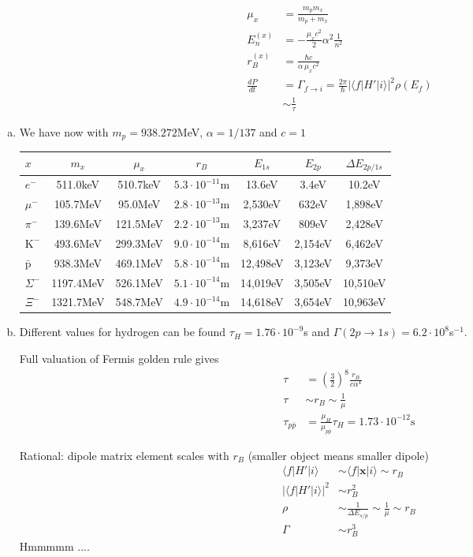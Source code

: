 \documentclass[../main.tex]{subfiles}
\begin{document}
\begin{align}
\mu_x&=\frac{m_pm_x}{m_p+m_x}\\
E_n^{(x)}&=-\frac{\mu_x c^2}{2}\alpha^2\frac{1}{n^2}\\
r_B^{(x)}&=\frac{\hbar c}{\alpha\, \mu_x c^2}\\
\frac{dP}{dt}&=\Gamma_{f\rightarrow i}=\frac{2\pi}{\hbar}|\langle f|H'|i\rangle|^2\rho(E_f)\\
&\sim\frac{1}{\tau}
\end{align}
\begin{enumerate}[(a)]
\item We have now with $m_p=938.272$MeV, $\alpha=1/137$ and $c=1$ 
\begin{center}
\begin{tabular}{lcccccc}
$x$              & $m_x$       & $\mu_x$ & $r_B$ & $E_{1s}$ & $E_{2p}$ & $\Delta E_{2p/1s}$ \\ \hline
$e^-$            & 511.0keV  & 510.7keV & $5.3\cdot10^{-11}$m &   13.6eV &   3.4eV &  10.2eV\\
$\mu^-$          & 105.7MeV  &  95.0MeV & $2.8\cdot10^{-13}$m &  2,530eV &   632eV & 1,898eV\\
$\pi^-$          & 139.6MeV  & 121.5MeV & $2.2\cdot10^{-13}$m &  3,237eV &   809eV & 2,428eV\\
$\text{K}^-$     & 493.6MeV  & 299.3MeV & $9.0\cdot10^{-14}$m &  8,616eV & 2,154eV & 6,462eV\\
$\bar{\text{p}}$ & 938.3MeV  & 469.1MeV & $5.8\cdot10^{-14}$m & 12,498eV & 3,123eV & 9,373eV\\
$\Sigma^-$       & 1197.4MeV & 526.1MeV & $5.1\cdot10^{-14}$m & 14,019eV & 3,505eV & 10,510eV\\
$\Xi^-$          & 1321.7MeV & 548.7MeV & $4.9\cdot10^{-14}$m & 14,618eV & 3,654eV & 10,963eV
\end{tabular}
\end{center}

\item Different values for hydrogen can be found $\tau_H=1.76\cdot10^{-9}$s and $\Gamma(2p\rightarrow1s) =6.2\cdot10^8$s$^{-1}$.

Full valuation of Fermis golden rule gives
\begin{align}
\tau&=\left(\frac{3}{2}\right)^8\frac{r_B}{c\alpha^4}\\
\tau&\sim r_B\sim\frac{1}{\mu}\\
\tau_{p\bar{p}}&=\frac{\mu_H}{\mu_{p\bar{p}}}\tau_H=1.73\cdot10^{-12}\text{s}
\end{align}

Rational: dipole matrix element scales with $r_B$ (smaller object means smaller dipole)
\begin{align}
\langle f|H'|i\rangle &\sim \langle f|\mathbf{x}|i\rangle\sim r_B\\
|\langle f|H'|i\rangle|^2 &\sim r_B^2\\
\rho&\sim \frac{1}{\Delta E_{s/p}}\sim\frac{1}{\mu}\sim r_B\\
\Gamma&\sim r_B^3
\end{align}
Hmmmmm ....

\end{enumerate}
\end{document}
